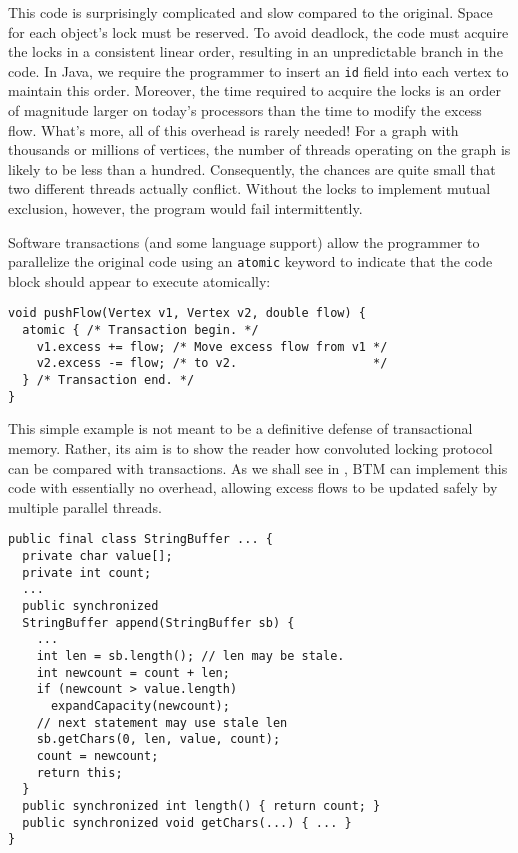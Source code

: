 \documentclass[preprint]{rdbacmconf}
\begin{document}
This code is surprisingly complicated and slow compared to the
original.  Space for each object's lock must be reserved.
To avoid deadlock, the code must acquire the locks in
a consistent linear order, resulting in an unpredictable branch in the
code.
In Java, we require the programmer to insert an \texttt{id} field into
each vertex to maintain this order.
Moreover, the time required to acquire the locks is
an order of magnitude larger on today's processors than the time to
modify the excess flow.
What's more, all of this overhead is rarely
needed!  For a graph with thousands or millions of vertices, the
number of threads operating on the graph is likely to be less than a
hundred.  Consequently, the chances are quite small that two different
threads actually conflict.  Without the locks to implement mutual
exclusion, however, the program would fail intermittently.

Software transactions (and some language support) allow the
programmer to parallelize the original code using an \texttt{atomic}
keyword to indicate that the code block should appear to execute
atomically: 
\par {\footnotesize\samepage
\begin{verbatim}
void pushFlow(Vertex v1, Vertex v2, double flow) {
  atomic { /* Transaction begin. */
    v1.excess += flow; /* Move excess flow from v1 */
    v2.excess -= flow; /* to v2.                   */
  } /* Transaction end. */
}
\end{verbatim}
} 

This simple example is not meant to be a definitive defense of
transactional memory.  Rather, its aim is to show the reader how
convoluted locking protocol can be compared with transactions.  As we
shall see in , BTM can implement this code with essentially no
overhead, allowing excess flows to be updated safely by multiple
parallel threads. 


\par {\footnotesize
\samepage
\begin{verbatim}
public final class StringBuffer ... {
  private char value[];
  private int count;
  ... 
  public synchronized
  StringBuffer append(StringBuffer sb) {
    ...
    int len = sb.length(); // len may be stale.
    int newcount = count + len; 
    if (newcount > value.length)
      expandCapacity(newcount);
    // next statement may use stale len
    sb.getChars(0, len, value, count);
    count = newcount;
    return this;
  }
  public synchronized int length() { return count; }
  public synchronized void getChars(...) { ... }
}
\end{verbatim}
}
\end{document}
